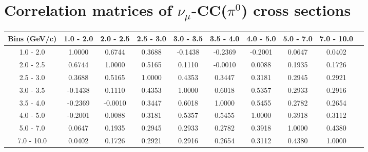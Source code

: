 \documentclass[aps, prd, reprint,showpacs,  preprintnumbers,amsmath,amssymb,superscriptaddress, nofootinbib]{revtex4-1}
\makeatletter
\newcommand{\numu}{\mbox{$\nu_{\mu}$}}                   %
\renewenvironment{table}
  {\def\@captype{table}}
  {}
\makeatother
\begin{document}
\section{Correlation matrices of $\numu$-CC($\pi^{0}$) cross sections}

\vspace{0.3cm}

\begin{table}
\centering
\begin{tabular}{cccccccccc}
\hline
  Bins (GeV/c) &    1.0 - 2.0 &    2.0 - 2.5 &    2.5 - 3.0 &    3.0 - 3.5 &    3.5 - 4.0 &    4.0 - 5.0 &    5.0 - 7.0 &   7.0 - 10.0 \\ 
\hline
  1.0 -  2.0  & 1.0000  & 0.6744  & 0.3688  &-0.1438  &-0.2369  &-0.2001  & 0.0647  & 0.0402 \\
  2.0 -  2.5  & 0.6744  & 1.0000  & 0.5165  & 0.1110  &-0.0010  & 0.0088  & 0.1935  & 0.1726 \\
  2.5 -  3.0  & 0.3688  & 0.5165  & 1.0000  & 0.4353  & 0.3447  & 0.3181  & 0.2945  & 0.2921 \\
  3.0 -  3.5  &-0.1438  & 0.1110  & 0.4353  & 1.0000  & 0.6018  & 0.5357  & 0.2933  & 0.2916 \\
  3.5 -  4.0  &-0.2369  &-0.0010  & 0.3447  & 0.6018  & 1.0000  & 0.5455  & 0.2782  & 0.2654 \\
  4.0 -  5.0  &-0.2001  & 0.0088  & 0.3181  & 0.5357  & 0.5455  & 1.0000  & 0.3918  & 0.3112 \\
  5.0 -  7.0  & 0.0647  & 0.1935  & 0.2945  & 0.2933  & 0.2782  & 0.3918  & 1.0000  & 0.4380 \\
  7.0 - 10.0  & 0.0402  & 0.1726  & 0.2921  & 0.2916  & 0.2654  & 0.3112  & 0.4380  & 1.0000 \\
\hline
\hline
\end{tabular}
\caption{Correlation matrix for bins of $d\sigma/dp_\mu$.}
\label{tb:piz_mup_cov}
\end{table}

\vspace{0.7cm}
\end{document}
